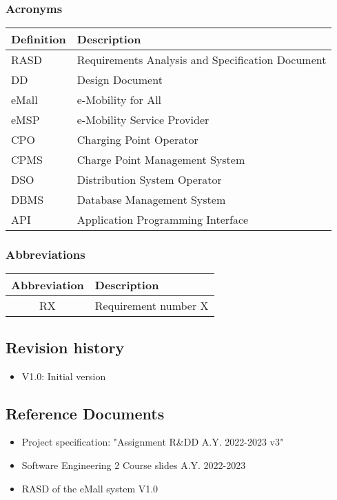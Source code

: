 \documentclass[../main.tex]{subfiles}
\begin{document}
\subsubsection{Acronyms}
\vspace{-0.5em}
\begin{center}
\begin{longtable}[\textwidth]{| l | l | } 
\hline
\textbf{Definition} & \textbf{Description} \\
\hline
RASD & Requirements Analysis and Specification Document \\
\hline
DD & Design Document \\
\hline
eMall & e-Mobility for All \\
\hline
eMSP & e-Mobility Service Provider \\
\hline
CPO & Charging Point Operator \\
\hline
CPMS & Charge Point Management System \\
\hline
DSO & Distribution System Operator \\
\hline
DBMS & Database Management System\\
\hline
API & Application Programming Interface\\
\hline
\end{longtable}
\end{center}

\vspace{-3em}
\subsubsection{Abbreviations}
\begin{center}
\begin{tabular}{| c | l |} 
 \hline
 \textbf{Abbreviation} & \textbf{Description} \\
 \hline
 RX & Requirement number X \\
 \hline
\end{tabular}
\end{center}

\subsection{Revision history}
\begin{itemize}
    \item V1.0: Initial version
\end{itemize}

\subsection{Reference Documents}
\begin{itemize}
    \item Project specification: "Assignment R\&DD A.Y. 2022-2023 v3"
    \item Software Engineering 2 Course slides A.Y. 2022-2023
    \item RASD of the eMall system V1.0
\end{itemize}
\end{document}
